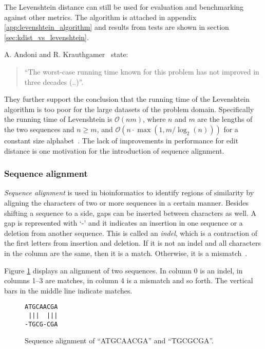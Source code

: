 The Levenshtein distance can still be used for evaluation and benchmarking
against other metrics. The algorithm is attached in appendix
\ref{app:levenshtein_algorithm} and results from tests are shown in section
\ref{sec:kdist_vs_levenshtein}.

A. Andoni and R. Krauthgamer~\cite[pp.~1--2]{andoni} state:
\begin{quote}
  ``The worst-case running time known for this problem has not improved in
  three decades (..)''.
\end{quote}
They further support the conclusion that the running time of the Levenshtein
algorithm is too poor for the large datasets of the problem domain.
Specifically the running time of Levenshtein is $\mathcal{O}(nm)$, where $n$
and $m$ are the lengths of the two sequences and $n\geq m$, and $\mathcal{O}(n
\cdot \max{(1,m/\log_2(n))})$ for a constant size alphabet~\cite{masek}.
The lack of improvements in performance for edit distance is one motivation
for the introduction of sequence alignment.


\subsubsection{Sequence alignment}

\emph{Sequence alignment} is used in bioinformatics to identify regions of
similarity by aligning the characters of two or more sequences in a certain
manner. Besides shifting a sequence to a side, gaps can be inserted between
characters as well. A gap is represented with `-' and it indicates an insertion
in one sequence or a deletion from another sequence. This is called an
\emph{indel}, which is a contraction of the first letters from insertion and
deletion. If it is not an indel and all characters in the column are the same,
then it is a match. Otherwise, it is a mismatch~\cite[pp.~135--136]{dong}.

Figure \ref{fig:seq_alignment} displays an alignment of two sequences. In
column 0 is an indel, in columns 1--3 are matches, in column
4 is a mismatch and so forth. The vertical bars in the middle
line indicate matches.

\begin{figure}[H]
  \centering
  \verb+ATGCAACGA+ \\
  \verb+ |||  |||+ \\
  \verb+-TGCG-CGA+
  \caption{Sequence alignment of ``ATGCAACGA'' and ``TGCGCGA''.}
  \label{fig:seq_alignment}
\end{figure}

